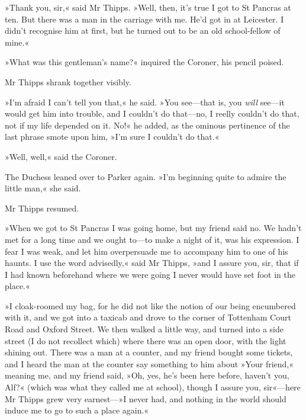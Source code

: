 »Thank you, sir,« said Mr Thipps. »Well, then, it's true I got to St Pancras at ten. But there was a man in the carriage with me. He'd got in at Leicester. I didn't recognise him at first, but he turned out to be an old school-fellow of mine.«

»What was this gentleman's name?« inquired the Coroner, his pencil poised.

Mr Thipps shrank together visibly.

»I'm afraid I can't tell you that,« he said. »You see—that is, you \textit{will} see—it would get him into trouble, and I couldn't do that—no, I reelly couldn't do that, not if my life depended on it. No!« he added, as the ominous pertinence of the last phrase smote upon him, »I'm sure I couldn't do that.«

»Well, well,« said the Coroner.

The Duchess leaned over to Parker again. »I'm beginning quite to admire the little man,« she said.

Mr Thipps resumed.

»When we got to St Pancras I was going home, but my friend said no. We hadn't met for a long time and we ought to—to make a night of it, was his expression. I fear I was weak, and let him overpersuade me to accompany him to one of his haunts. I use the word advisedly,« said Mr Thipps, »and I assure you, sir, that if I had known beforehand where we were going I never would have set foot in the place.«

»I cloak-roomed my bag, for he did not like the notion of our being encumbered with it, and we got into a taxicab and drove to the corner of Tottenham Court Road and Oxford Street. We then walked a little way, and turned into a side street (I do not recollect which) where there was an open door, with the light shining out. There was a man at a counter, and my friend bought some tickets, and I heard the man at the counter say something to him about »Your friend,« meaning me, and my friend said, »Oh, yes, he's been here before, haven't you, Alf?« (which was what they called me at school), though I assure you, sir«---here Mr Thipps grew very earnest---»I never had, and nothing in the world should induce me to go to such a place again.«

